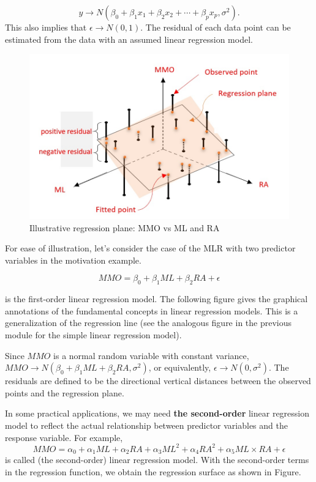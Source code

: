 \documentclass[
]{book}
\begin{document}
\[y \to N(\beta_0 + \beta_1 x_1 + \beta_2 x_2 + \cdots + \beta_p x_p, \sigma^2).\]
This also implies that \(\epsilon \to N(0,1)\). The residual of each data point can be estimated from the data with an assumed linear regression model.

\begin{figure}[!ht]

{\centering \includegraphics[width=0.8\linewidth,]{img04/w04-RegressionPlane} 

}

\caption{Illustrative regression plane: MMO vs ML and RA}\label{fig:w10-RegressionPlane}
\end{figure}

For ease of illustration, let's consider the case of the MLR with two predictor variables in the motivation example.

\[MMO = \beta_0 + \beta_1 ML + \beta_2 RA + \epsilon\]

is the first-order linear regression model. The following figure gives the graphical annotations of the fundamental concepts in linear regression models. This is a generalization of the regression line (see the analogous figure in the previous module for the simple linear regression model).

Since \(MMO\) is a normal random variable with constant variance, \(MMO \to N(\beta_0+\beta_1ML +\beta_2 RA, \sigma^2)\), or equivalently, \(\epsilon \to N(0, \sigma^2)\). The residuals are defined to be the directional vertical distances between the observed points and the regression plane.

In some practical applications, we may need \textbf{the second-order} linear regression model to reflect the actual relationship between predictor variables and the response variable. For example, \[MMO = \alpha_0 + \alpha_1 ML + \alpha_2 RA + \alpha_3 ML^2 + \alpha_4 RA^2 + \alpha_5 ML\times RA + \epsilon\] is called (the second-order) linear regression model. With the second-order terms in the regression function, we obtain the regression surface as shown in Figure.
\end{document}
